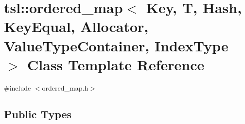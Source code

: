 \hypertarget{classtsl_1_1ordered__map}{}\section{tsl\+::ordered\+\_\+map$<$ Key, T, Hash, Key\+Equal, Allocator, Value\+Type\+Container, Index\+Type $>$ Class Template Reference}
\label{classtsl_1_1ordered__map}


{\ttfamily \#include $<$ordered\+\_\+map.\+h$>$}

\subsection*{Public Types}
